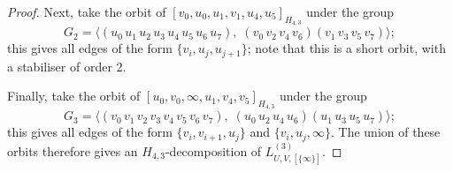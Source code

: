 \begin{subappendices}
\begin{proof}
Next, take the orbit of $[v_0, u_0, u_1, v_1, u_4, u_5]_{H_{4,3}}$ under the group
\[
    G_2 = \langle (u_0 \, u_1 \, u_2 \, u_3 \, u_4 \, u_5 \, u_6 \, u_7), \;
    (v_0 \, v_2 \, v_4 \, v_6) (v_1 \, v_3 \, v_5 \, v_7)\rangle;
\]
this gives all edges of the form $\{v_i, u_j, u_{j+1}\}$; note that this is a
short orbit, with a stabiliser of order 2.

Finally, take the orbit of $[u_0, v_0, \infty, u_1, v_4, v_5]_{H_{4,3}}$ under the group
\[
    G_3 = \langle (v_0 \, v_1 \, v_2 \, v_3 \, v_4 \, v_5 \, v_6 \, v_7), \;
    (u_0 \, u_2 \, u_4 \, u_6) (u_1 \, u_3 \, u_5 \, u_7)\rangle;
\]
this gives all edges of the form $\{v_i, v_{i+1}, u_j\}$ and $\{v_i, u_j, \infty\}$.
The union of these orbits therefore gives an ${H_{4,3}}$-decomposition of $L_{U,V,[\{\infty\}]}^{(3)}$.
\end{proof}

\end{subappendices}
